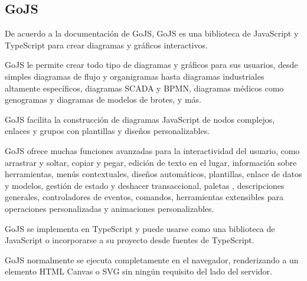 \subsection*{GoJS}
De acuerdo a la documentación de GoJS\cite{noauthor_gojs_nodate}, GoJS es una biblioteca de JavaScript y TypeScript para crear diagramas y gráficos interactivos.


GoJS le permite crear todo tipo de diagramas y gráficos para sus usuarios, desde simples diagramas de flujo y organigramas hasta diagramas industriales altamente específicos, diagramas SCADA y BPMN, diagramas médicos como genogramas y diagramas de modelos de brotes, y más. 


GoJS facilita la construcción de diagramas JavaScript de nodos complejos, enlaces y grupos con plantillas y diseños personalizables.


GoJS ofrece muchas funciones avanzadas para la interactividad del usuario, como arrastrar y soltar, copiar y pegar, edición de texto en el lugar, información sobre herramientas, menús contextuales, diseños automáticos, plantillas, enlace de datos y modelos, gestión de estado y deshacer transaccional, paletas , descripciones generales, controladores de eventos, comandos, herramientas extensibles para operaciones personalizadas y animaciones personalizables.


GoJS se implementa en TypeScript y puede usarse como una biblioteca de JavaScript o incorporarse a su proyecto desde fuentes de TypeScript. 


GoJS normalmente se ejecuta completamente en el navegador, renderizando a un elemento HTML Canvas o SVG sin ningún requisito del lado del servidor.


